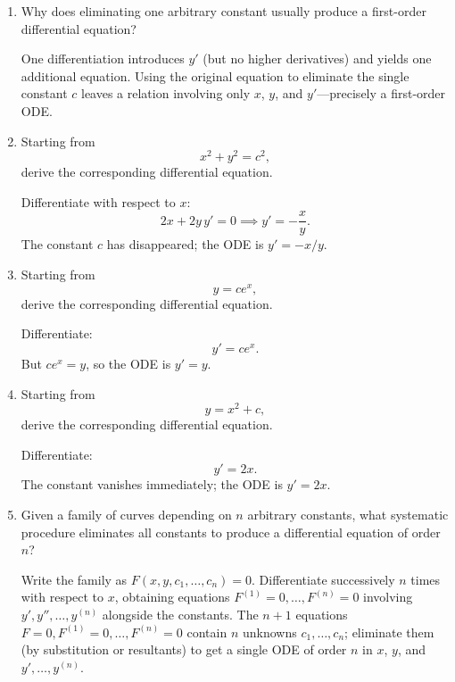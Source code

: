 \documentclass{essay}
\begin{document}
\begin{enumerate}[leftmargin=*, itemsep=8pt]
  \item Why does eliminating one arbitrary constant usually produce a
    first-order differential equation?

    \begin{answer} One differentiation introduces $y'$ (but no
      higher derivatives) and yields one additional equation.  Using
      the original equation to eliminate the single constant $c$ leaves
      a relation involving only $x$, $y$, and $y'$---precisely a first-order ODE.
    \end{answer}

  \item Starting from \[ x^2+y^2=c^2, \] derive the corresponding
    differential equation.

    \begin{answer} Differentiate with respect to $x$:
      \[
        2x + 2y\,y' = 0 \implies y' = -\frac{x}{y}.
      \]
      The constant $c$ has disappeared; the ODE is $y' = -x/y$.
    \end{answer}

  \item Starting from \[ y=ce^x, \] derive the corresponding
    differential equation.

    \begin{answer} Differentiate:
      \[
        y' = ce^x.
      \]
      But $ce^x = y$, so the ODE is $y' = y$.
    \end{answer}

  \item Starting from \[ y=x^2+c, \] derive the corresponding
    differential equation.

    \begin{answer} Differentiate:
      \[
        y' = 2x.
      \]
      The constant vanishes immediately; the ODE is $y'=2x$.
    \end{answer}

  \item Given a family of curves depending on $n$ arbitrary
    constants, what systematic procedure eliminates all constants to
    produce a differential equation of order~$n$?

    \begin{answer} Write the family as $F(x,y,c_1,\ldots,c_n)=0$.
      Differentiate successively $n$ times with respect to $x$,
      obtaining equations $F^{(1)}=0,\ldots,F^{(n)}=0$ involving
      $y',y'',\ldots,y^{(n)}$ alongside the constants.  The $n+1$
      equations $F=0,F^{(1)}=0,\ldots,F^{(n)}=0$ contain $n$ unknowns
      $c_1,\ldots,c_n$; eliminate them (by substitution or resultants)
      to get a single ODE of order $n$ in $x$, $y$, and $y',\ldots,y^{(n)}$.
    \end{answer}


\end{enumerate}
\end{document}
